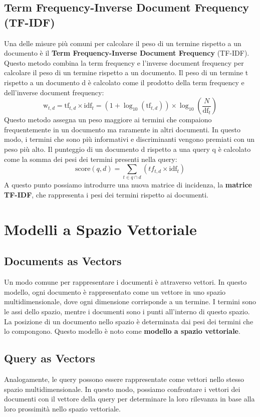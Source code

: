 \documentclass{report}
\begin{document}
	\subsection{Term Frequency-Inverse Document Frequency (TF-IDF)}
	Una delle misure più comuni per calcolare il peso di un termine rispetto a un documento è il \textbf{Term Frequency-Inverse Document Frequency} (TF-IDF). Questo metodo combina la term frequency e l'inverse document frequency per calcolare il peso di un termine rispetto a un documento. Il peso di un termine t rispetto a un documento d è calcolato come il prodotto della term frequency e dell'inverse document frequency:
	\[
	\text{w}_{t,d} = \text{tf}_{t,d} \times \text{idf}_t = (1 + \log_{10}(\text{tf}_{t,d})) \times \log_{10}\left(\frac{N}{\text{df}_t}\right)
	\]
	Questo metodo assegna un peso maggiore ai termini che compaiono frequentemente in un documento ma raramente in altri documenti. In questo modo, i termini che sono più informativi e discriminanti vengono premiati con un peso più alto. Il punteggio di un documento d rispetto a una query q è calcolato come la somma dei pesi dei termini presenti nella query:
	\[
	\text{score}(q,d) = \sum_{t \in q \cap d} (tf_{t,d} \times \text{idf}_t)
	\]
	A questo punto possiamo introdurre una nuova matrice di incidenza, la \textbf{matrice TF-IDF}, che rappresenta i pesi dei termini rispetto ai documenti.
	
	\section{Modelli a Spazio Vettoriale}
	\subsection{Documents as Vectors}
	Un modo comune per rappresentare i documenti è attraverso vettori. In questo modello, ogni documento è rappresentato come un vettore in uno spazio multidimensionale, dove ogni dimensione corrisponde a un termine. I termini sono le assi dello spazio, mentre i documenti sono i punti all'interno di questo spazio. La posizione di un documento nello spazio è determinata dai pesi dei termini che lo compongono. Questo modello è noto come \textbf{modello a spazio vettoriale}.

	\subsection{Query as Vectors}
	Analogamente, le query possono essere rappresentate come vettori nello stesso spazio multidimensionale. In questo modo, possiamo confrontare i vettori dei documenti con il vettore della query per determinare la loro rilevanza in base alla loro prossimità nello spazio vettoriale. 
\end{document}
